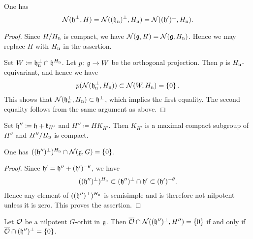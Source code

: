 \begin{lemma} \label{lem:NilpotentAndNonCompact}
	One has
	\begin{align*}
		\mathcal{N}(\mathfrak{h}^\perp, H) = \mathcal{N}((\mathfrak{h}_{\mathrm{n}})^\perp, H_{\mathrm{n}}) = \mathcal{N}((\mathfrak{h}')^\perp, H_{\mathrm{n}}).
	\end{align*}
\end{lemma}

\begin{proof}
	Since $H/H_{\mathrm{n}}$ is compact, we have $\mathcal{N}(\mathfrak{g}, H) = \mathcal{N}(\mathfrak{g}, H_{\mathrm{n}})$.
	Hence we may replace $H$ with $H_{\mathrm{n}}$ in the assertion.
	
	Set $W\coloneq \mathfrak{h}_{\mathrm{n}}^\perp \cap \mathfrak{h}^{H_{\mathrm{n}}}$.
	Let $p\colon \mathfrak{g} \rightarrow W$ be the orthogonal projection.
	Then $p$ is $H_{\mathrm{n}}$-equivariant, and hence we have
	\begin{align*}
		p(\mathcal{N}(\mathfrak{h}_{\mathrm{n}}^\perp, H_{\mathrm{n}})) \subset \mathcal{N}(W, H_{\mathrm{n}}) = \left\{0 \right\}.
	\end{align*}
	This shows that $\mathcal{N}(\mathfrak{h}_{\mathrm{n}}^\perp, H_{\mathrm{n}}) \subset \mathfrak{h}^\perp$, which implies the first equality.
	The second equality follows from the same argument as above.
\end{proof}

Set $\mathfrak{h''} \coloneq \mathfrak{h} + \mathfrak{k}_{H'}$ and $H'' \coloneq H K_{H'}$.
Then $K_{H'}$ is a maximal compact subgroup of $H''$ and $H''/H_{\mathrm{n}}$ is compact.

\begin{lemma} \label{lem:NilpotentAndInvariant}
	One has $((\mathfrak{h''})^\perp)^{H_{\mathrm{n}}} \cap \mathcal{N}(\mathfrak{g}, G) = \left\{0 \right\}$.
\end{lemma}

\begin{proof}
	Since $\mathfrak{h'} = \mathfrak{h''} + (\mathfrak{h'})^{-\theta}$, we have
	\begin{align*}
		((\mathfrak{h''})^\perp)^{H_{\mathrm{n}}} \subset (\mathfrak{h''})^\perp \cap \mathfrak{h'} \subset (\mathfrak{h'})^{-\theta}.
	\end{align*}
	Hence any element of $((\mathfrak{h''})^\perp)^{H_{\mathrm{n}}}$ is semisimple and is therefore not nilpotent unless it is zero.
	This proves the assertion.
\end{proof}

\begin{corollary} \label{cor:NilpotentAndPerp}
	Let $\mathcal{O}$ be a nilpotent $G$-orbit in $\mathfrak{g}$.
	Then $\overline{\mathcal{O}} \cap \mathcal{N}((\mathfrak{h''})^\perp, H'') = \left\{0 \right\}$ if and only if $\overline{\mathcal{O}} \cap (\mathfrak{h''})^\perp = \left\{0 \right\}$.
\end{corollary}

